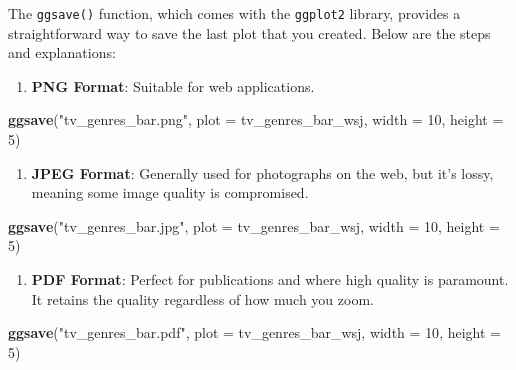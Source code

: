 \documentclass[
]{book}
\newenvironment{Shaded}{\begin{snugshade}}{\end{snugshade}}
\newcommand{\AttributeTok}[1]{\textcolor[rgb]{0.13,0.29,0.53}{#1}}
\newcommand{\DecValTok}[1]{\textcolor[rgb]{0.00,0.00,0.81}{#1}}
\newcommand{\FunctionTok}[1]{\textcolor[rgb]{0.13,0.29,0.53}{\textbf{#1}}}
\newcommand{\NormalTok}[1]{#1}
\newcommand{\StringTok}[1]{\textcolor[rgb]{0.31,0.60,0.02}{#1}}
\providecommand{\tightlist}{%
  \setlength{\itemsep}{0pt}\setlength{\parskip}{0pt}}
\begin{document}
The \texttt{ggsave()} function, which comes with the \texttt{ggplot2} library, provides a straightforward way to save the last plot that you created. Below are the steps and explanations:

\begin{enumerate}
\def\labelenumi{\arabic{enumi}.}
\tightlist
\item
  \textbf{PNG Format}: Suitable for web applications.
\end{enumerate}

\begin{Shaded}
\begin{Highlighting}[]
\FunctionTok{ggsave}\NormalTok{(}\StringTok{"tv\_genres\_bar.png"}\NormalTok{, }\AttributeTok{plot =}\NormalTok{ tv\_genres\_bar\_wsj, }\AttributeTok{width =} \DecValTok{10}\NormalTok{, }\AttributeTok{height =} \DecValTok{5}\NormalTok{)}
\end{Highlighting}
\end{Shaded}

\begin{enumerate}
\def\labelenumi{\arabic{enumi}.}
\setcounter{enumi}{1}
\tightlist
\item
  \textbf{JPEG Format}: Generally used for photographs on the web, but it's lossy, meaning some image quality is compromised.
\end{enumerate}

\begin{Shaded}
\begin{Highlighting}[]
\FunctionTok{ggsave}\NormalTok{(}\StringTok{"tv\_genres\_bar.jpg"}\NormalTok{, }\AttributeTok{plot =}\NormalTok{ tv\_genres\_bar\_wsj, }\AttributeTok{width =} \DecValTok{10}\NormalTok{, }\AttributeTok{height =} \DecValTok{5}\NormalTok{)}
\end{Highlighting}
\end{Shaded}

\begin{enumerate}
\def\labelenumi{\arabic{enumi}.}
\setcounter{enumi}{2}
\tightlist
\item
  \textbf{PDF Format}: Perfect for publications and where high quality is paramount. It retains the quality regardless of how much you zoom.
\end{enumerate}

\begin{Shaded}
\begin{Highlighting}[]
\FunctionTok{ggsave}\NormalTok{(}\StringTok{"tv\_genres\_bar.pdf"}\NormalTok{, }\AttributeTok{plot =}\NormalTok{ tv\_genres\_bar\_wsj, }\AttributeTok{width =} \DecValTok{10}\NormalTok{, }\AttributeTok{height =} \DecValTok{5}\NormalTok{)}
\end{Highlighting}
\end{Shaded}
\end{document}
